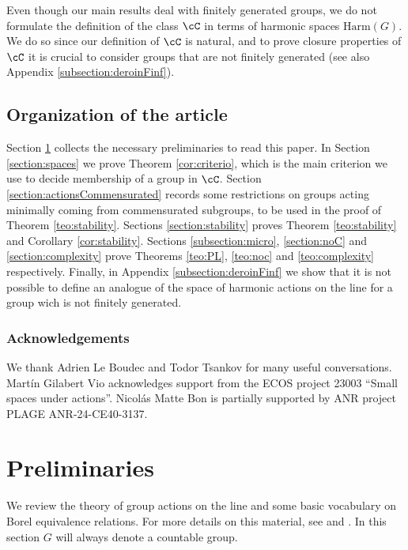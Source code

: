 \documentclass[reqno]{amsart}
\begin{document}
Even though our main results deal with finitely generated groups, we do not formulate the definition of the class $\cC$ in terms of harmonic spaces $\mathrm{Harm}(G)$. We do so since our definition of $\cC$ is natural, and to prove closure properties of $\cC$ it is crucial to consider groups that are not finitely generated (see also Appendix \ref{subsection:deroinFinf}).

\subsection{Organization of the article} Section \ref{section:preliminaries} collects the necessary preliminaries to read this paper. In Section \ref{section:spaces} we prove Theorem \ref{cor:criterio}, which is the main criterion we use to decide membership of a group in $\cC$.  Section \ref{section:actionsCommensurated} records some restrictions on groups acting minimally coming from commensurated subgroups, to be used in the proof of Theorem \ref{teo:stability}. Sections \ref{section:stability} proves Theorem \ref{teo:stability} and Corollary \ref{cor:stability}. Sections \ref{subsection:micro}, \ref{section:noC} and \ref{section:complexity} prove Theorems \ref{teo:PL}, \ref{teo:noc} and \ref{teo:complexity} respectively.
Finally, in Appendix \ref{subsection:deroinFinf} we show that it is not possible to define an analogue of the space of harmonic actions on the line for a group wich is not finitely generated.

\subsubsection*{Acknowledgements} We thank Adrien Le Boudec and Todor Tsankov for many useful conversations. Martín Gilabert Vio acknowledges support from the ECOS project 23003 “Small spaces under actions”. Nicol\'as Matte Bon is partially supported by ANR project PLAGE ANR-24-CE40-3137. 
\tableofcontents
\section{Preliminaries} \label{section:preliminaries} 
We review the theory of group actions on the line and some basic vocabulary on Borel equivalence relations. For more details on this material, see \cite{DeroinNavasRivas2016, Navas2011} and \cite{KB}. In this section $G$ will always denote a countable group.
\end{document}
